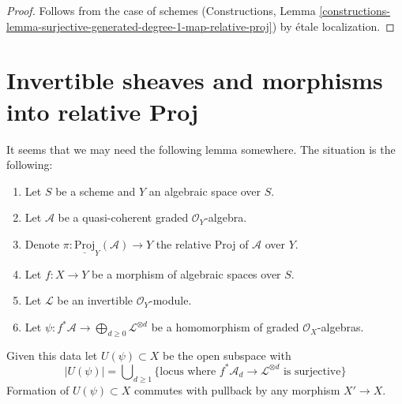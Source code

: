 \begin{proof}
Follows from the case of schemes
(Constructions, Lemma
\ref{constructions-lemma-surjective-generated-degree-1-map-relative-proj})
by \'etale localization.
\end{proof}










\section{Invertible sheaves and morphisms into relative Proj}
\label{section-invertible-relative-proj}

\noindent
It seems that we may need the following lemma somewhere.
The situation is the following:
\begin{enumerate}
\item Let $S$ be a scheme and $Y$ an algebraic space over $S$.
\item Let $\mathcal{A}$ be a quasi-coherent graded $\mathcal{O}_Y$-algebra.
\item Denote $\pi : \underline{\text{Proj}}_Y(\mathcal{A}) \to Y$ the relative
Proj of $\mathcal{A}$ over $Y$.
\item Let $f : X \to Y$ be a morphism of algebraic spaces over $S$.
\item Let $\mathcal{L}$ be an invertible $\mathcal{O}_Y$-module.
\item Let
$\psi : f^*\mathcal{A} \to \bigoplus_{d \geq 0} \mathcal{L}^{\otimes d}$
be a homomorphism of graded $\mathcal{O}_X$-algebras.
\end{enumerate}
Given this data let $U(\psi) \subset X$ be the open subspace with
$$
|U(\psi)| = \bigcup\nolimits_{d \geq 1}
\{\text{locus where }f^*\mathcal{A}_d \to \mathcal{L}^{\otimes d}
\text{ is surjective}\}
$$
Formation of $U(\psi) \subset X$ commutes with
pullback by any morphism $X' \to X$.

